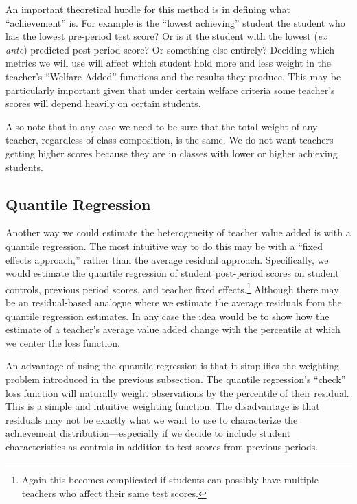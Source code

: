 \documentclass[letterpaper,12pt]{article}
\begin{document}
An important theoretical hurdle for this method is in defining what ``achievement'' is. For example is the ``lowest achieving'' student the student who has the lowest pre-period test score? Or is it the student with the lowest (\textit{ex ante}) predicted post-period score? Or something else entirely? Deciding which metrics we will use will affect which student hold more and less weight in the teacher's ``Welfare Added'' functions and the results they produce. This may be particularly important given that under certain welfare criteria some teacher's scores will depend heavily on certain students.

Also note that in any case we need to be sure that the total weight of any teacher, regardless of class composition, is the same. We do not want teachers getting higher scores because they are in classes with lower or higher achieving students.


\subsection{Quantile Regression}
Another way we could estimate the heterogeneity of teacher value added is with a quantile regression. The most intuitive way to do this may be with a ``fixed effects approach,'' rather than the average residual approach. Specifically, we would estimate the quantile regression of student post-period scores on student controls, previous period scores, and teacher fixed effects.\footnote{Again this becomes complicated if students can possibly have multiple teachers who affect their same test scores.} Although there may be an residual-based analogue where we estimate the average residuals from the quantile regression estimates. In any case the idea would be to show how the estimate of a teacher's average value added change with the percentile at which we center the loss function. 

An advantage of using the quantile regression is that it simplifies the weighting problem introduced in the previous subsection. The quantile regression's ``check'' loss function will naturally weight observations by the percentile of their residual. This is a simple and intuitive weighting function. The disadvantage is that residuals may not be exactly what we want to use to characterize the achievement distribution---especially if we decide to include student characteristics as controls in addition to test scores from previous periods.
\end{document}
